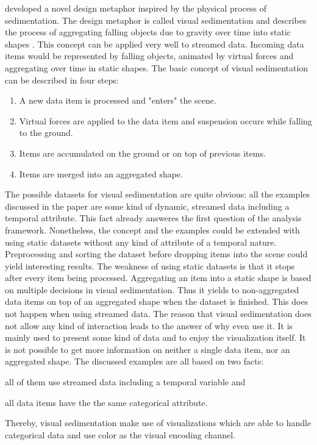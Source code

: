 \citeauthor{Huron2013} developed a novel design metaphor inspired by the physical process of sedimentation. The design metaphor is called visual sedimentation and describes the process of aggregating falling objects due to gravity over time into static shapes . This concept can be applied very well to streamed data. Incoming data items would be represented by falling objects, animated by virtual forces and aggregating over time in static shapes.
The basic concept of visual sedimentation can be described in four steps:

\begin{enumerate}
\item A new data item is processed and "enters" the scene.
\item Virtual forces are applied to the data item and suspension occurs while falling to the ground.
\item Items are accumulated on the ground or on top of previous items.
\item Items are merged into an aggregated shape.
\end{enumerate}

The possible datasets for visual sedimentation are quite obvious: all the examples discussed in the paper are some kind of dynamic, streamed data including a temporal attribute. This fact already answeres the first question of the analysis framework. Nonetheless, the concept and the examples could be extended with using static datasets without any kind of attribute of a temporal nature. Preprocessing and sorting the dataset before dropping items into the scene could yield interesting results. The weakness of using static datasets is that it stops after every item being processed. Aggregating an item into a static shape is based on multiple decisions in visual sedimentation. Thus it yields to non-aggregated data items on top of an aggregated shape when the dataset is finished. This does not happen when using streamed data.
The reason that visual sedimentation does not allow any kind of interaction leads to the answer of why even use it. It is mainly used to present some kind of data and to enjoy the visualization itself. It is not possible to get more information on neither a single data item, nor an aggregated shape.
The discussed examples are all based on two facts:
\begin{enumerate*}
\item all of them use streamed data including a temporal variable and
\item all data items have the the same categorical attribute.
\end{enumerate*}
Thereby, visual sedimentation make use of visualizations which are able to handle categorical data and use color as the visual encoding channel.

